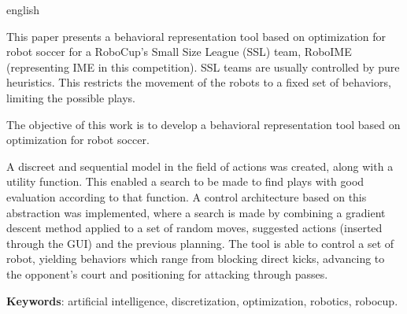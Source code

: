\begin{resumo}[Abstract]\begin{otherlanguage*}{english}

  This paper presents a behavioral representation tool based on optimization for
  robot soccer for a RoboCup's Small Size League (SSL) team, RoboIME
  (representing IME in this competition). SSL teams are usually controlled by
  pure heuristics. This restricts the movement of the robots to a fixed set of
  behaviors, limiting the possible plays.

  The objective of this work is to develop a behavioral representation tool
  based on optimization for robot soccer.

  A discreet and sequential model in the field of actions was created, along
  with a utility function. This enabled a search to be made to find plays with
  good evaluation according to that function. A control architecture based on
  this abstraction was implemented, where a search is made by combining a
  gradient descent method applied to a set of random moves, suggested actions
  (inserted through the GUI) and the previous planning. The tool is able to
  control a set of robot, yielding behaviors which range from blocking direct
  kicks, advancing to the opponent's court and positioning for attacking through
  passes.

  \textbf{Keywords}: artificial intelligence, discretization, optimization, robotics, robocup.
\end{otherlanguage*}\end{resumo}

